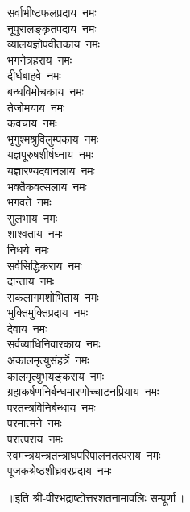 \begin{flushleft}
सर्वाभीष्टफलप्रदाय~नमः\\
नूपुरालङ्कृतपदाय~नमः\hfill{}\\
व्यालयज्ञोपवीतकाय~नमः\\
भगनेत्रहराय~नमः\\
दीर्घबाहवे~नमः\\
बन्धविमोचकाय~नमः\\
तेजोमयाय~नमः\\
कवचाय~नमः\\
भृगुश्मश्रुविलुम्पकाय~नमः\\
यज्ञपूरुषशीर्षघ्नाय~नमः\\
यज्ञारण्यदवानलाय~नमः\\
भक्तैकवत्सलाय~नमः\hfill{}\\
भगवते~नमः\\
सुलभाय~नमः\\
शाश्वताय~नमः\\
निधये~नमः\\
सर्वसिद्धिकराय~नमः\\
दान्ताय~नमः\\
सकलागमशोभिताय~नमः\\
भुक्तिमुक्तिप्रदाय~नमः\\
देवाय~नमः\\
सर्वव्याधिनिवारकाय~नमः\hfill{}\\
अकालमृत्युसंहर्त्रे~नमः\\
कालमृत्युभयङ्कराय~नमः\\
ग्रहाकर्षणनिर्बन्धमारणोच्चाटनप्रियाय~नमः\\
परतन्त्रविनिर्बन्धाय~नमः\\
परमात्मने~नमः\\
परात्पराय~नमः\\
स्वमन्त्रयन्त्रतन्त्राघपरिपालनतत्पराय~नमः\\
पूजकश्रेष्ठशीघ्रवरप्रदाय~नमः\\
\end{flushleft}
॥इति श्री-वीरभद्राष्टोत्तरशतनामावलिः सम्पूर्णा॥
